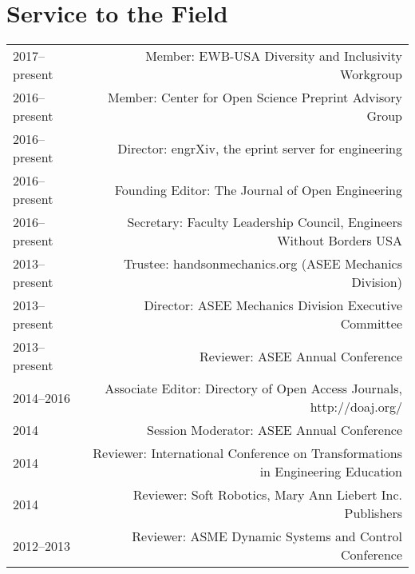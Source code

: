 \section*{Service to the Field}
\begin{tabular}{L!{\VRule}R}
2017--present&Member: EWB-USA Diversity and Inclusivity Workgroup\\
2016--present&Member: Center for Open Science Preprint Advisory Group\\
2016--present&Director: engrXiv, the eprint server for engineering\\
2016--present&Founding Editor: The Journal of Open Engineering\\
2016--present&Secretary: Faculty Leadership Council, Engineers Without Borders USA\\
2013--present&Trustee: handsonmechanics.org (ASEE Mechanics Division)\\
2013--present&Director: ASEE Mechanics Division Executive Committee\\
2013--present&Reviewer: ASEE Annual Conference\\
2014--2016&Associate Editor: Directory of Open Access Journals, http://doaj.org/\\
2014&Session Moderator: ASEE Annual Conference\\
2014&Reviewer: International Conference on Transformations in Engineering Education\\
2014&Reviewer: Soft Robotics, Mary Ann Liebert Inc. Publishers\\
2012--2013&Reviewer: ASME Dynamic Systems and Control Conference\\
\end{tabular}